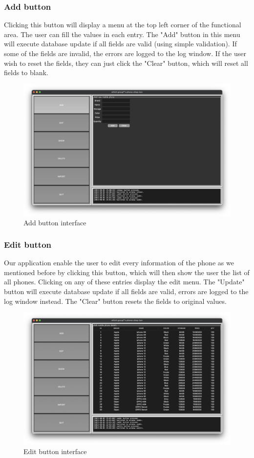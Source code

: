\documentclass[12pt,oneside,a4paper]{article}
\begin{document}
\subsubsection{Add button}
Clicking this button will display a menu at the top left corner of the functional area. The user can fill the values in each entry. The "Add" button in this menu will execute database update if all fields are valid (using simple validation). If some of the fields are invalid, the errors are logged to the log window. If the user wish to reset the fields, they can just click the "Clear" button, which will reset all fields to blank.
\begin{figure}[H]
  \centerline{\includegraphics[scale=0.35]{add-clicked.png}}
  \caption{Add button interface}
\end{figure}

\subsubsection{Edit button}
Our application enable the user to edit every information of the phone as we mentioned before by clicking this button, which will then show the user the list of all phones. Clicking on any of these entries display the edit menu. The "Update" button will execute database update if all fields are valid, errors are logged to the log window instead. The "Clear" button resets the fields to original values.
\begin{figure}[H]
  \centerline{\includegraphics[scale=0.35]{edit-clicked.png}}
  \caption{Edit button interface}
\end{figure}
\end{document}
